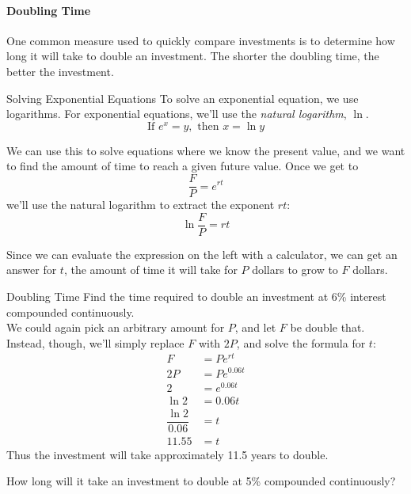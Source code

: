\paragraph{Doubling Time} One common measure used to quickly compare investments is to determine how long it will take to double an investment.  The shorter the doubling time, the better the investment.

\begin{proc}{Solving Exponential Equations}
To solve an exponential equation, we use logarithms.  For exponential equations, we'll use the \textit{natural logarithm}, $\ln$.
\[\textrm{If } e^x = y, \textrm{ then } x = \ln y\]
\end{proc}

We can use this to solve equations where we know the present value, and we want to find the amount of time to reach a given future value.  Once we get to \[\dfrac{F}{P}=e^{rt}\] we'll use the natural logarithm to extract the exponent $rt$:
\[\ln \dfrac{F}{P} = rt\]

Since we can evaluate the expression on the left with a calculator, we can get an answer for $t$, the amount of time it will take for $P$ dollars to grow to $F$ dollars.

\begin{example}[https://www.youtube.com/watch?v=WKByWayHv00]{Doubling Time}
Find the time required to double an investment at 6\% interest compounded continuously.\\

We could again pick an arbitrary amount for $P$, and let $F$ be double that.  Instead, though, we'll simply replace $F$ with $2P$, and solve the formula for $t$:
\begin{align*}
F &= Pe^{rt}\\
2P &= Pe^{0.06t}\\
2 &= e^{0.06t}\\
\ln 2 &= 0.06t\\
\dfrac{\ln 2}{0.06} &= t\\
11.55 &= t
\end{align*}
Thus the investment will take approximately 11.5 years to double.
\end{example}

\begin{try}
How long will it take an investment to double at 5\% compounded continuously?
\end{try}

